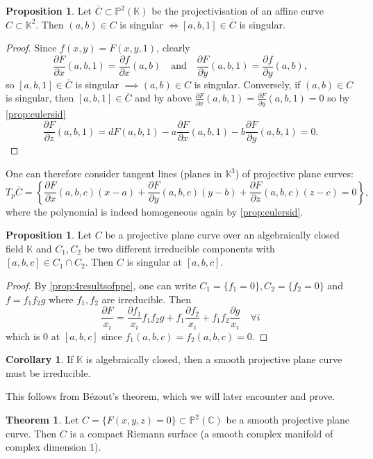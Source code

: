 \documentclass{article}
\newcommand{\C}{\mathbb{C}}
\newcommand{\K}{\mathbb{K}}
\newcommand{\p}{\mathbb{P}}
\theoremstyle{definition}
\newtheorem{prop}[defn]{Proposition}
\newtheorem{thm}[defn]{Theorem}
\newtheorem{coro}[defn]{Corollary}
\begin{document}
\begin{prop}
Let $\overline C\subset\p^2(\K)$ be the projectivisation of an affine curve $C\subset\K^2$. Then $(a,b)\in C$ is singular $\iff [a,b,1]\in\overline C$ is singular.
\end{prop}
\begin{proof}
Since $f(x,y)=F(x,y,1)$, clearly
\[
\frac{\partial F}{\partial x}(a,b,1)=\frac{\partial f}{\partial x}(a,b)\quad\text{and}\quad\frac{\partial F}{\partial y}(a,b,1)=\frac{\partial f}{\partial y}(a,b),
\]
so $[a,b,1]\in\overline C$ is singular $\implies (a,b)\in C$ is singular. Conversely, if $(a,b)\in C$ is singular, then $[a,b,1]\in\overline C$ and by above $\frac{\partial F}{\partial x}(a,b,1)=\frac{\partial F}{\partial y}(a,b,1)=0$ so by \ref{prop:eulersid}
\[
\frac{\partial F}{\partial z}(a,b,1)=dF(a,b,1)-a\frac{\partial F}{\partial x}(a,b,1)-b\frac{\partial F}{\partial y}(a,b,1)=0.
\]
\end{proof}

One can therefore consider tangent lines (planes in $\K^3$) of projective plane curves:
\[
T_p\overline C=\left\{\frac{\partial F}{\partial x}(a,b,c)(x-a)+\frac{\partial F}{\partial y}(a,b,c)(y-b)+\frac{\partial F}{\partial z}(a,b,c)(z-c)=0\right\},
\]
where the polynomial is indeed homogeneous again by \ref{prop:eulersid}.

\begin{prop}
\label{prop:nodesaresingular}
Let $C$ be a projective plane curve over an algebraically closed field $\K$ and $C_1,C_2$ be two different irreducible components with $[a,b,c]\in C_1\cap C_2$. Then $C$ is singular at $[a,b,c]$. 
\end{prop}
\begin{proof}
By \ref{prop:4resultsofppc}, one can write $C_1=\{f_1=0\},C_2=\{f_2=0\}$ and $f=f_1f_2g$ where $f_1,f_2$ are irreducible. Then
\[
\frac{\partial F}{x_i}=\frac{\partial f_1}{x_i}f_1f_2g+f_1\frac{\partial f_2}{x_i}+f_1f_2\frac{\partial g}{x_i} \quad\forall i
\]
which is 0 at $[a,b,c]$ since $f_1(a,b,c)=f_2(a,b,c)=0$.
\end{proof}
\begin{coro}
\label{coro:smoothimpliesirred}
If $\K$ is algebraically closed, then a smooth projective plane curve must be irreducible.
\end{coro}
This follows from Bézout's theorem, which we will later encounter and prove.

\begin{thm}
Let $C=\{F(x,y,z)=0\}\subset\p^2(\C)$ be a smooth projective plane curve. Then $C$ is a compact Riemann surface (a smooth complex manifold of complex dimension 1).
\end{thm}
\end{document}

